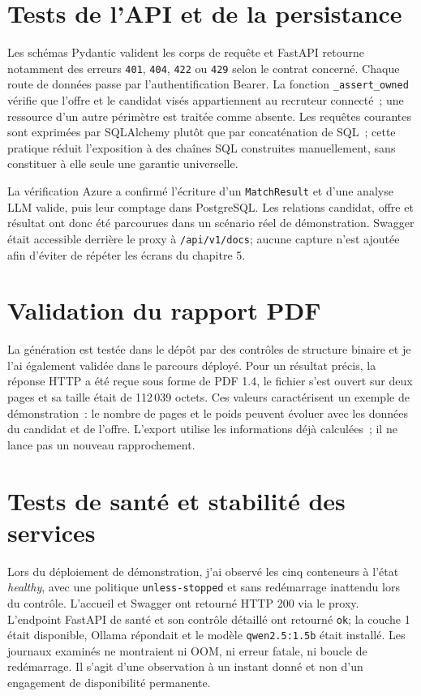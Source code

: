 \section{Tests de l'API et de la persistance}

Les schémas Pydantic valident les corps de requête et FastAPI retourne notamment des erreurs \texttt{401}, \texttt{404}, \texttt{422} ou \texttt{429} selon le contrat concerné. Chaque route de données passe par l'authentification Bearer. La fonction \texttt{\_assert\_owned} vérifie que l'offre et le candidat visés appartiennent au recruteur connecté~; une ressource d'un autre périmètre est traitée comme absente. Les requêtes courantes sont exprimées par SQLAlchemy plutôt que par concaténation de SQL~; cette pratique réduit l'exposition à des chaînes SQL construites manuellement, sans constituer à elle seule une garantie universelle.

La vérification Azure a confirmé l'écriture d'un \texttt{MatchResult} et d'une analyse LLM valide, puis leur comptage dans PostgreSQL. Les relations candidat, offre et résultat ont donc été parcourues dans un scénario réel de démonstration. Swagger était accessible derrière le proxy à \texttt{/api/v1/docs}; aucune capture n'est ajoutée afin d'éviter de répéter les écrans du chapitre 5.

\section{Validation du rapport PDF}

La génération est testée dans le dépôt par des contrôles de structure binaire et je l'ai également validée dans le parcours déployé. Pour un résultat précis, la réponse HTTP a été reçue sous forme de PDF 1.4, le fichier s'est ouvert sur deux pages et sa taille était de 112\,039 octets. Ces valeurs caractérisent un exemple de démonstration~: le nombre de pages et le poids peuvent évoluer avec les données du candidat et de l'offre. L'export utilise les informations déjà calculées~; il ne lance pas un nouveau rapprochement.

\section{Tests de santé et stabilité des services}

Lors du déploiement de démonstration, j'ai observé les cinq conteneurs à l'état \emph{healthy}, avec une politique \texttt{unless-stopped} et sans redémarrage inattendu lors du contrôle. L'accueil et Swagger ont retourné HTTP 200 via le proxy. L'endpoint FastAPI de santé et son contrôle détaillé ont retourné \texttt{ok}; la couche 1 était disponible, Ollama répondait et le modèle \texttt{qwen2.5:1.5b} était installé. Les journaux examinés ne montraient ni OOM, ni erreur fatale, ni boucle de redémarrage. Il s'agit d'une observation à un instant donné et non d'un engagement de disponibilité permanente.

